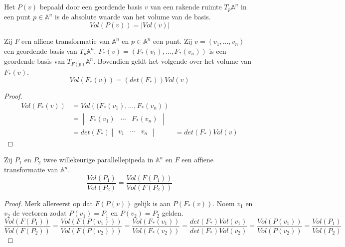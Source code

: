 \documentclass[main.tex]{subfiles}
\begin{document}
\begin{de}
  Het  $P(v)$ bepaald door een geordende basis $v$ van een rakende ruimte $T_{p}\mathbb{A}^{n}$ in een punt $p\in\mathbb{A}^{n}$ is de absolute waarde van het volume van de basis.
  \[ Vol\left(P(v)\right) = |Vol(v)|\]
\end{de}

\begin{st}
  Zij $F$ een affiene transformatie van $\mathbb{A}^{n}$ en $p\in\mathbb{A}^{n}$ een punt.
  Zij $v= (v_{1},\dotsc,v_{n})$ een geordende basis van $T_{p}\mathbb{A}^{n}$.
  $F_{*}(v) = (F_{*}(v_{1}),\dotsc,F_{*}(v_{n}))$ is een geordende basis van $T_{F(p)}\mathbb{A}^{n}$.
  Bovendien geldt het volgende over het volume van $F_{*}(v)$.
  \[ Vol\left( F_{*}(v) \right) = \left(det(F_{*}) \right)Vol(v) \]

  \begin{proof}
    \[
    \begin{array}{rll}
      Vol\left( F_{*}(v) \right) &= Vol\left((F_{*}(v_{1}),\dotsc,F_{*}(v_{n})\right) &\\
                                &= \begin{vmatrix}F_{*}(v_{1}) & \cdots & F_{*}(v_{n})\end{vmatrix} &\\
                                &= det(F_{*}) \begin{vmatrix}v_{1} & \cdots & v_{n}\end{vmatrix} &= det(F_{*})Vol(v)
    \end{array}
    \]
  \end{proof}
\end{st}

\begin{gev}
  Zij $P_{1}$ en $P_{2}$ twee willekeurige parallellepipeda in $\mathbb{A}^{n}$ en $F$ een affiene transformatie van $\mathbb{A}^{n}$.
  \[ \frac{Vol(P_{1})}{Vol(P_{2})} = \frac{Vol(F(P_{1}))}{Vol(F(P_{2}))} \]

  \begin{proof}
    Merk allereerst op dat $F(P(v))$ gelijk is aan $P(F_{*}(v))$. \waarom
    Noem $v_{1}$ en $v_{2}$ de vectoren zodat $P(v_{1}) = P_{1}$ en $P(v_{2}) = P_{2}$ gelden.
    \[
    \frac{Vol(F(P_{1}))}{Vol(F(P_{2}))}
    = \frac{Vol(F(P(v_{1})))}{Vol(F(P(v_{2})))}
    = \frac{Vol(F_{*}(v_{1}))}{Vol(F_{*}(v_{2}))}
    = \frac{det(F_{*})Vol(v_{1})}{det(F_{*})Vol(v_{2})}
    = \frac{Vol(P(v_{1}))}{Vol(P(v_{2}))}
    = \frac{Vol(P_{1})}{Vol(P_{2})}
    \]
  \end{proof}
\end{gev}
\end{document}
